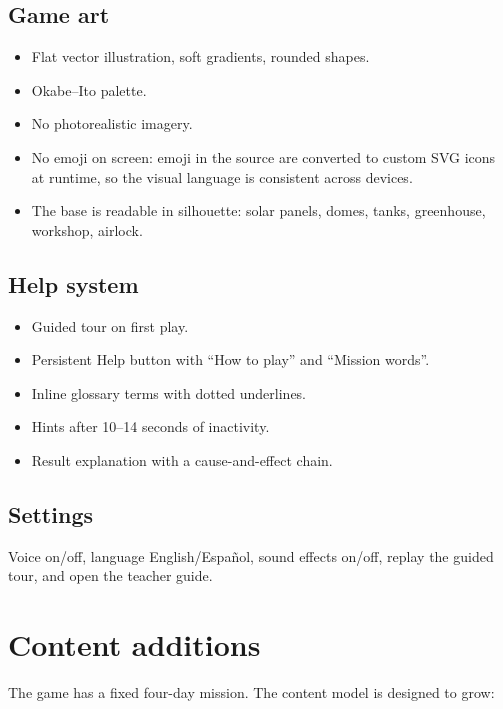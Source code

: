 \documentclass[11pt,a4paper]{article}
\begin{document}
\subsection{Game art}

\begin{itemize}
  \item Flat vector illustration, soft gradients, rounded shapes.
  \item Okabe--Ito palette.
  \item No photorealistic imagery.
  \item No emoji on screen: emoji in the source are converted to custom SVG icons at runtime, so the visual language is consistent across devices.
  \item The base is readable in silhouette: solar panels, domes, tanks, greenhouse, workshop, airlock.
\end{itemize}

\subsection{Help system}

\begin{itemize}
  \item Guided tour on first play.
  \item Persistent Help button with ``How to play'' and ``Mission words''.
  \item Inline glossary terms with dotted underlines.
  \item Hints after 10--14 seconds of inactivity.
  \item Result explanation with a cause-and-effect chain.
\end{itemize}

\subsection{Settings}

Voice on/off, language English/Espa\~nol, sound effects on/off, replay the guided tour, and open the teacher guide.

\section{Content additions}

The game has a fixed four-day mission. The content model is designed to grow:
\end{document}
